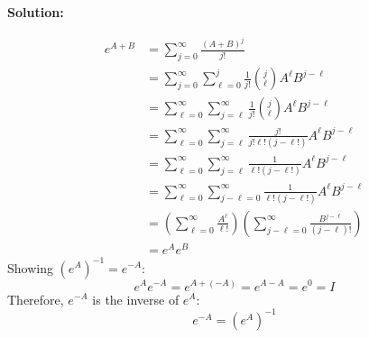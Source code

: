 \documentclass[12pt]{article}
\newenvironment{solution}{
    \textbf{Solution:}
    
}{
    
    \vspace{2em}
}
\begin{document}
\begin{solution}
    \[
        \begin{aligned}
            e^{A+B} &= \sum_{j=0}^\infty \frac{(A+B)^j}{j!}\\
            &= \sum_{j=0}^\infty \sum_{\ell=0}^j \frac{1}{j!} \binom{j}{\ell} A^{\ell}B^{j-\ell}\\
            &= \sum_{\ell=0}^\infty \sum_{j=\ell}^\infty \frac{1}{j!} \binom{j}{\ell} A^{\ell}B^{j-\ell}\\
            &= \sum_{\ell=0}^\infty \sum_{j=\ell}^\infty \frac{j!}{j! \ell! (j-\ell!)}A^{\ell}B^{j-\ell}\\
            &= \sum_{\ell=0}^\infty \sum_{j=\ell}^\infty \frac{1}{ \ell! (j-\ell!)}A^{\ell}B^{j-\ell}\\
            &= \sum_{\ell=0}^\infty \sum_{j-\ell = 0}^\infty \frac{1}{ \ell! (j-\ell!)}A^{\ell}B^{j-\ell}\\
            &= \left( \sum_{\ell=0}^\infty \frac{A^{\ell}}{\ell!} \right) \left( \sum_{j-\ell = 0}^\infty \frac{B^{j-\ell}}{(j-\ell)!} \right)\\
            &= e^A e^B
        \end{aligned}
    \]
    Showing \((e^A)^{-1} = e^{-A}\):
    \[
        e^{A} e^{-A} = e^{A + (-A)} = e^{A - A} = e^{0} = I
    \]
    Therefore, \(e^{-A}\) is the inverse of \(e^A\):
    \[
        e^{-A} = (e^A)^{-1}
    \]

\end{solution}
\end{document}
